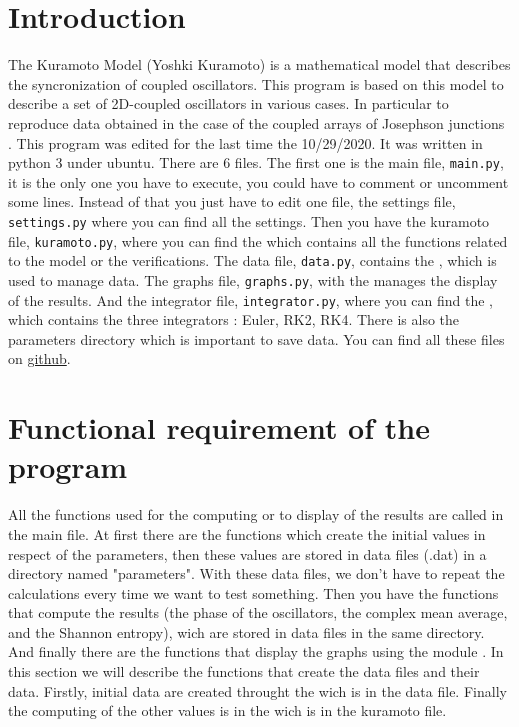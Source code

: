 \documentclass[1pt, a4paper]{article}
\begin{document}
\maketitlepage
\tableofcontents
\newpage
\section{Introduction}
\label{sec:1}
\noindent
The Kuramoto Model (Yoshki Kuramoto) is a mathematical model that describes the syncronization of coupled oscillators. This program is based on this model to describe a set of 2D-coupled oscillators in various cases. In particular to reproduce data obtained in the case of the coupled arrays of Josephson junctions \cite{josephson}. This program was edited for the last time the 10/29/2020. It was written in python 3 under ubuntu. There are 6 files. The first one is the main file, \texttt{main.py}, it is the only one you have to execute, you could have to comment or uncomment some lines. Instead of that you just have to edit one file, the settings file, \texttt{settings.py} where you can find all the settings. Then you have the kuramoto file, \texttt{kuramoto.py}, where you can find the  which contains all the functions related to the model or the verifications. The data file, \texttt{data.py}, contains the , which is used to manage data. The graphs file, \texttt{graphs.py}, with the  manages the display of the results. And the integrator file, \texttt{integrator.py}, where you can find the , which contains the three integrators : Euler, RK2, RK4. There is also the parameters directory which is important to save data. You can find all these files on \href{https://github.com/faucheresse/swimming_pool.git}{github}.
\section{Functional requirement of the program}
\label{sec:2}
\noindent
All the functions used for the computing or to display of the results are called in the main file. At first there are the functions which create the initial values in respect of the parameters, then these values are stored in data files (.dat) in a directory named "parameters". With these data files, we don't have to repeat the calculations every time we want to test something. Then you have the functions that compute the results (the phase of the oscillators, the complex mean average, and the Shannon entropy), wich are stored in data files in the same directory. And finally there are the functions that display the graphs using the module . In this section we will describe the functions that create the data files and their data. Firstly, initial data are created throught the  wich is in the data file. Finally the computing of the other values is in the  wich is in the kuramoto file.
\end{document}
